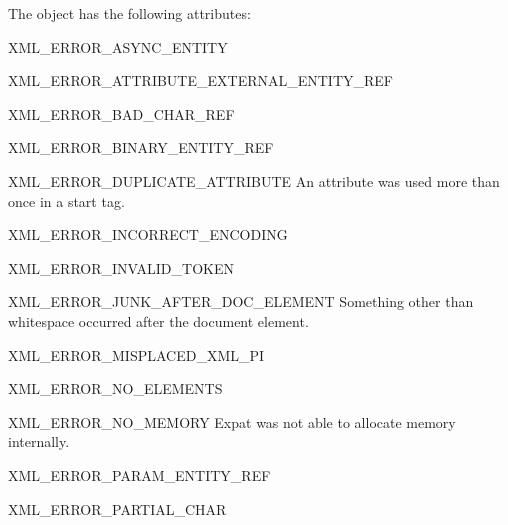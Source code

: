 The  object has the following attributes:

\begin{datadesc}{XML_ERROR_ASYNC_ENTITY}
\end{datadesc}

\begin{datadesc}{XML_ERROR_ATTRIBUTE_EXTERNAL_ENTITY_REF}
\end{datadesc}

\begin{datadesc}{XML_ERROR_BAD_CHAR_REF}
\end{datadesc}

\begin{datadesc}{XML_ERROR_BINARY_ENTITY_REF}
\end{datadesc}

\begin{datadesc}{XML_ERROR_DUPLICATE_ATTRIBUTE}
An attribute was used more than once in a start tag.
\end{datadesc}

\begin{datadesc}{XML_ERROR_INCORRECT_ENCODING}
\end{datadesc}

\begin{datadesc}{XML_ERROR_INVALID_TOKEN}
\end{datadesc}

\begin{datadesc}{XML_ERROR_JUNK_AFTER_DOC_ELEMENT}
Something other than whitespace occurred after the document element.
\end{datadesc}

\begin{datadesc}{XML_ERROR_MISPLACED_XML_PI}
\end{datadesc}

\begin{datadesc}{XML_ERROR_NO_ELEMENTS}
\end{datadesc}

\begin{datadesc}{XML_ERROR_NO_MEMORY}
Expat was not able to allocate memory internally.
\end{datadesc}

\begin{datadesc}{XML_ERROR_PARAM_ENTITY_REF}
\end{datadesc}

\begin{datadesc}{XML_ERROR_PARTIAL_CHAR}
\end{datadesc}

